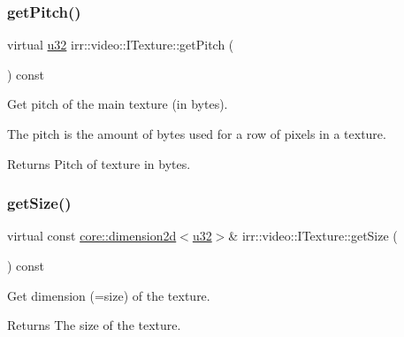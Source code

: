 \subsubsection{\texorpdfstring{get\+Pitch()}{getPitch()}}
{\footnotesize\ttfamily virtual \hyperlink{namespaceirr_a0416a53257075833e7002efd0a18e804}{u32} irr\+::video\+::\+I\+Texture\+::get\+Pitch (\begin{DoxyParamCaption}{ }\end{DoxyParamCaption}) const\hspace{0.3cm}{\ttfamily [pure virtual]}}



Get pitch of the main texture (in bytes). 

The pitch is the amount of bytes used for a row of pixels in a texture. \begin{DoxyReturn}{Returns}
Pitch of texture in bytes. 
\end{DoxyReturn}
\mbox{\label{classirr_1_1video_1_1ITexture_adfcf9558c0f1ae543782c03f7903c48e}} 
\subsubsection{\texorpdfstring{get\+Size()}{getSize()}}
{\footnotesize\ttfamily virtual const \hyperlink{classirr_1_1core_1_1dimension2d}{core\+::dimension2d}$<$\hyperlink{namespaceirr_a0416a53257075833e7002efd0a18e804}{u32}$>$\& irr\+::video\+::\+I\+Texture\+::get\+Size (\begin{DoxyParamCaption}{ }\end{DoxyParamCaption}) const\hspace{0.3cm}{\ttfamily [pure virtual]}}



Get dimension (=size) of the texture. 

\begin{DoxyReturn}{Returns}
The size of the texture. 
\end{DoxyReturn}
\mbox{\label{classirr_1_1video_1_1ITexture_afff3160f6aa5f749365ae4f776a440f3}} 
